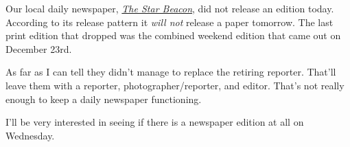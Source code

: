 Our local daily newspaper, \href{https://www.starbeacon.com/}{\emph{The
Star Beacon}}, did not release an edition today. According to its
release pattern it \emph{will not} release a paper tomorrow. The last
print edition that dropped was the combined weekend edition that came
out on December 23rd.

As far as I can tell they didn't manage to replace the retiring
reporter. That'll leave them with a reporter, photographer/reporter, and
editor. That's not really enough to keep a daily newspaper functioning.

I'll be very interested in seeing if there is a newspaper edition at all
on Wednesday.
